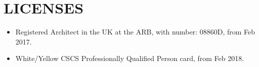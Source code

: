 \section*{LICENSES}
    \begin{itemize}[leftmargin=0.45cm, itemsep=0em, topsep=0.5em, parsep=0.2em]
        \item
        Registered Architect in the UK at the ARB, with number: 08860D, from Feb 2017.
        \item
        White/Yellow CSCS Professionally Qualified Person card, from Feb 2018.
    \end{itemize}
